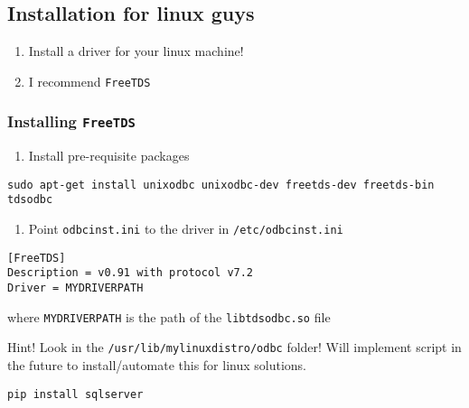 \hypertarget{installation-for-linux-guys}{%
\subsection{Installation for linux
guys}\label{installation-for-linux-guys}}

\begin{enumerate}
\def\labelenumi{\arabic{enumi}.}

\item
  Install a driver for your linux machine!
\item
  I recommend \texttt{FreeTDS}
\end{enumerate}

\hypertarget{installing-freetds}{%
\subsubsection{\texorpdfstring{Installing
\texttt{FreeTDS}}{Installing FreeTDS}}\label{installing-freetds}}

\begin{enumerate}
\def\labelenumi{\arabic{enumi}.}

\item
  Install pre-requisite packages
\end{enumerate}

\begin{verbatim}
sudo apt-get install unixodbc unixodbc-dev freetds-dev freetds-bin tdsodbc
\end{verbatim}

\begin{enumerate}
\def\labelenumi{\arabic{enumi}.}
\setcounter{enumi}{1}

\item
  Point \texttt{odbcinst.ini} to the driver in
  \texttt{/etc/odbcinst.ini}
\end{enumerate}

\begin{verbatim}
[FreeTDS]
Description = v0.91 with protocol v7.2
Driver = MYDRIVERPATH
\end{verbatim}

where \texttt{MYDRIVERPATH} is the path of the \texttt{libtdsodbc.so}
file

Hint! Look in the \texttt{/usr/lib/mylinuxdistro/odbc} folder! Will
implement script in the future to install/automate this for linux
solutions.

\begin{verbatim}
pip install sqlserver
\end{verbatim}

